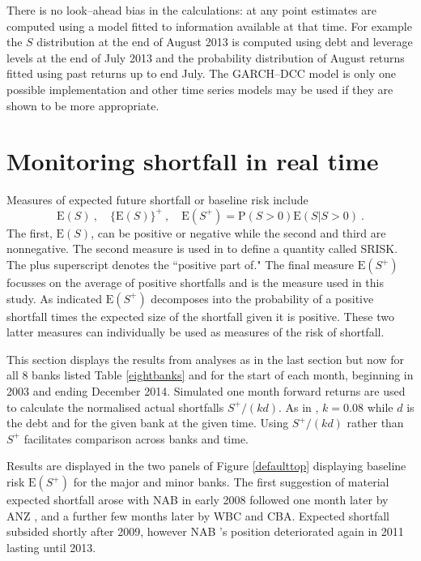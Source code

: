 \documentclass[authoryear]{elsarticle}
\newcommand{\E}{{\mathrm E}}
\newcommand{\p}{\mathrm{P}}
\newcommand{\cq}{\ ,\quad }
\newcommand{\fref}[1]{Figure \ref{#1}}
\newcommand{\tref}[1]{Table \ref{#1}}
\begin{document}
There is no look--ahead bias in the calculations:  at any point estimates are computed using a model fitted to information available at that time.  For example the $S$ distribution at the  end of August 2013 is computed using debt and leverage levels at the end of July 2013 and the probability distribution of August returns fitted using past returns up to end July.  The GARCH--DCC model is only one possible implementation and other time series models may be used if they are shown to be more appropriate.




\section{Monitoring shortfall in real time}\label{brisk}

Measures of expected future shortfall or baseline risk include
$$
\E(S) \cq \{\E(S)\}^+ \cq \E(S^+)= \p(S>0)\E(S|S>0)\ .
$$
The first, $\E(S)$, can be positive or negative while the second and third are nonnegative.   The second measure is used in \cite{brownlees2015} to define a quantity called  SRISK.  The plus superscript denotes the ``positive part of."  The final measure $\E(S^+)$ focusses on the average of positive shortfalls and is the measure used in this study.   As indicated $\E(S^+)$ decomposes into the probability of a positive shortfall times the expected size of the shortfall given it is positive.   These two latter measures can individually be used as measures of the risk of shortfall.

This section displays the results from analyses as in the last section but now for all 8 banks listed \tref{eightbanks} and for the start of  each month,  beginning in 2003 and ending December 2014.   Simulated one month forward returns are used to calculate the normalised actual shortfalls
$
S^+/(kd)
$.
 As in \cite{brownlees2015}, $k=0.08$ while $d$ is the debt and for the given bank at the given time.  Using $S^+/(kd)$ rather than $S^+$  facilitates comparison across banks and  time.

Results are displayed in the two  panels of \fref{defaulttop} displaying baseline risk $\E(S^+)$ for the major and minor banks. The first suggestion of material expected shortfall arose with NAB  in early 2008 followed one month later by ANZ , and a further few months later by WBC  and CBA. Expected shortfall subsided shortly after 2009, however NAB 's position deteriorated again in 2011 lasting until 2013.
\end{document}
